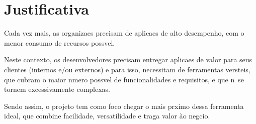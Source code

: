\section{Justificativa}

\label{pro:justificativa}

Cada vez mais, as organiza\co es precisam de aplica\co es de alto desempenho, com o menor consumo de recursos poss\ih vel.

Neste contexto, os desenvolvedores precisam entregar aplica\co es de valor para seus clientes (internos e/ou externos) e para isso, necessitam de ferramentas vers\ah teis, que cubram o maior n\uh mero poss\ih vel de funcionalidades e requisitos, e que n\ao\ se tornem excessivamente complexas.

Sendo assim, o projeto tem como foco chegar o mais pr\oh ximo dessa ferramenta ideal, que combine facilidade, versatilidade e traga valor \`ao neg\oh cio.
